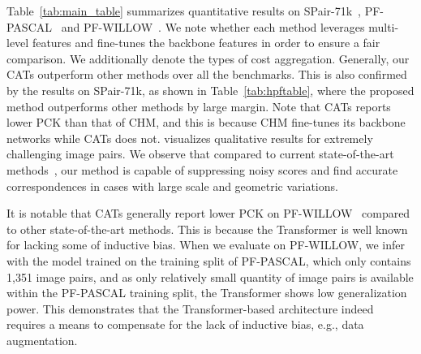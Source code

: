 Table~\ref{tab:main_table} summarizes quantitative results on SPair-71k~\cite{min2019spair}, PF-PASCAL~\cite{ham2017proposal} and PF-WILLOW~\cite{ham2016proposal}. We note whether each method leverages multi-level features and fine-tunes the backbone features in order to ensure a fair comparison. We additionally denote the types of cost aggregation. Generally, our CATs outperform other methods over all the benchmarks. This is also confirmed by the results on SPair-71k, as shown in Table~\ref{tab:hpftable}, where the proposed method outperforms other methods by large margin. Note that CATs reports lower PCK than that of CHM, and this is because CHM fine-tunes its backbone networks while CATs does not.   visualizes qualitative results for extremely challenging image pairs. We observe that compared to current state-of-the-art methods~\cite{liu2020semantic,min2020learning}, our method is capable of suppressing noisy scores and find accurate correspondences in cases with large scale and geometric variations. 

It is notable that CATs generally report lower PCK on PF-WILLOW~\cite{ham2016proposal} compared to other state-of-the-art methods. This is because the Transformer is well known for lacking some of inductive bias. When we evaluate on PF-WILLOW, we infer with the model trained on the training split of PF-PASCAL, which only contains 1,351 image pairs, and as only relatively small quantity of image pairs is available within the PF-PASCAL training split, the Transformer shows low generalization power. This demonstrates that the Transformer-based architecture indeed requires a means to compensate for the lack of inductive bias, e.g., data augmentation. 


